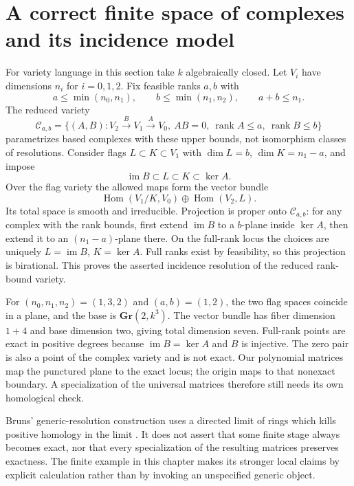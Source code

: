 \documentclass[11pt,oneside,openany]{book}
\theoremstyle{definition}\newtheorem{definition}[theorem]{Definition}
\theoremstyle{remark}\newtheorem{remark}[theorem]{Remark}
\begin{document}
\section{A correct finite space of complexes and its incidence model}
For variety language in this section take $k$ algebraically closed.
Let $V_i$ have dimensions $n_i$ for $i=0,1,2$. Fix feasible ranks
$a,b$ with
\[
 a\le\min(n_0,n_1),\qquad b\le\min(n_1,n_2),\qquad a+b\le n_1.
\]
The reduced variety
\[
 \mathcal C_{a,b}=\{(A,B):V_2\xrightarrow B V_1\xrightarrow A V_0,
       \ AB=0,\ \operatorname{rank}A\le a,\ \operatorname{rank}B\le b\}
\]
parametrizes based complexes with these upper bounds, not isomorphism
classes of resolutions. Consider flags
$L\subset K\subset V_1$ with $\dim L=b$, $\dim K=n_1-a$, and impose
\[
 \operatorname{im}B\subset L\subset K\subset\ker A.
\]
Over the flag variety the allowed maps form the vector bundle
\[
 \operatorname{Hom}(V_1/K,V_0)\oplus\operatorname{Hom}(V_2,L).
\]
Its total space is smooth and irreducible. Projection is proper onto
$\mathcal C_{a,b}$: for any complex with the rank bounds, first extend
$\operatorname{im}B$ to a $b$-plane inside $\ker A$, then extend it to an
$(n_1-a)$-plane there. On the full-rank locus the choices are uniquely
$L=\operatorname{im}B$, $K=\ker A$. Full ranks exist by feasibility,
so this projection is birational. This proves the asserted incidence
resolution of the reduced rank-bound variety.

For $(n_0,n_1,n_2)=(1,3,2)$ and $(a,b)=(1,2)$, the two flag spaces
coincide in a plane, and the base is $\mathbf{Gr}(2,k^3)$. The vector
bundle has fiber dimension $1+4$ and base dimension two, giving total
dimension seven. Full-rank points are exact in positive degrees because
$\operatorname{im}B=\ker A$ and $B$ is injective. The zero pair is also a
point of the complex variety and is not exact. Our polynomial matrices
map the punctured plane to the exact locus; the origin maps to that
nonexact boundary. A specialization of the universal matrices therefore
still needs its own homological check.

Bruns' generic-resolution construction uses a directed limit of rings
which kills positive homology in the limit \cite[Theorem 1, pp.35--36]{PersBruns}.
It does not assert that some finite stage always becomes exact, nor
that every specialization of the resulting matrices preserves exactness.
The finite example in this chapter makes its stronger local claims by
explicit calculation rather than by invoking an unspecified generic object.
\end{document}
